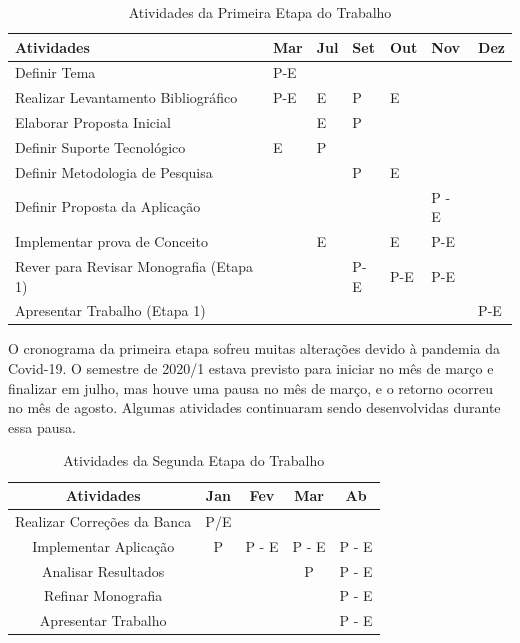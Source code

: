 \begin{table}[htbp]
	\centering
	\caption{Atividades da Primeira Etapa do Trabalho}
	\label{tab04}
	
	\begin{tabular}{p{7cm}p{1cm}p{1cm}p{1cm}p{1cm}p{1cm}p{1cm}}
		\toprule
		\textbf{Atividades} & \textbf{Mar} & 
		\textbf{Jul}  & \textbf{Set}& \textbf{Out} & \textbf{Nov} & \textbf{Dez}\\
		\midrule
		Definir Tema & P-E & & &  &\\
		\midrule
		Realizar Levantamento Bibliográfico & P-E & E & P & E & & \\
		\midrule
		Elaborar Proposta Inicial&  & E & P &  &  &\\
		\midrule
		Definir Suporte Tecnológico & E & P & &  & &\\
		\midrule
		Definir Metodologia de Pesquisa&  &  & P & E & &\\
		\midrule
		Definir Proposta da Aplicação &  & & &  & P - E &\\
		\midrule
		Implementar prova de Conceito &  & E & & E & P-E &\\
		\midrule
		Rever para Revisar Monografia (Etapa 1) &  & & P-E & P-E & P-E &\\
		\midrule
		Apresentar Trabalho (Etapa 1) &  &  & &  & & P-E\\
		\bottomrule
	\end{tabular}
\end{table}


O cronograma da primeira etapa sofreu muitas alterações devido à pandemia da Covid-19. O semestre de 2020/1 estava previsto para iniciar no mês de março e finalizar em julho, mas houve uma pausa no 
mês de março, e o retorno ocorreu no mês de agosto. Algumas atividades continuaram sendo desenvolvidas durante essa pausa.



\begin{table}[htbp]
	\centering
	\caption{Atividades da Segunda Etapa do Trabalho}
	\label{tab05}
	
	\begin{tabular}{ccccc}
		\toprule
		\textbf{Atividades} & \textbf{Jan} & 
		\textbf{Fev}  & \textbf{Mar}& \textbf{Ab}\\
		\midrule
		 Realizar Correções da Banca & P/E &  &  &  \\
		\midrule
		 Implementar Aplicação & P & P - E & P - E & P - E  \\
		\midrule
		 Analisar Resultados &  &  &P &P - E  \\
		\midrule
		 Refinar Monografia &  &  &  & P - E \\
		\midrule
		 Apresentar Trabalho &  & & & P - E \\
		\bottomrule
	\end{tabular}
\end{table}

